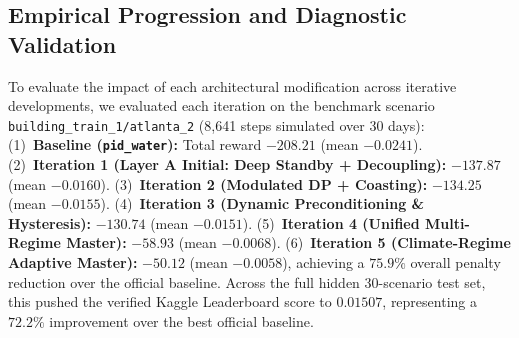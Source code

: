 \documentclass{article}
\begin{document}
\begin{table}[h]
\centering
\caption{Official Kaggle Competition Leaderboard Performance on 30 Hidden Test Scenarios (MAE, lower is better).}
\label{tab:leaderboard}
\end{table}

\subsection{Empirical Progression and Diagnostic Validation}
To evaluate the impact of each architectural modification across iterative developments, we evaluated each iteration on the benchmark scenario \texttt{building\_train\_1/atlanta\_2} (8,641 steps simulated over 30 days):
(1)~\textbf{Baseline (\texttt{pid\_water}):} Total reward $-208.21$ (mean $-0.0241$).
(2)~\textbf{Iteration 1 (Layer A Initial: Deep Standby + Decoupling):} $-137.87$ (mean $-0.0160$).
(3)~\textbf{Iteration 2 (Modulated DP + Coasting):} $-134.25$ (mean $-0.0155$).
(4)~\textbf{Iteration 3 (Dynamic Preconditioning \& Hysteresis):} $-130.74$ (mean $-0.0151$).
(5)~\textbf{Iteration 4 (Unified Multi-Regime Master):} $-58.93$ (mean $-0.0068$).
(6)~\textbf{Iteration 5 (Climate-Regime Adaptive Master):} $\mathbf{-50.12}$ (mean $\mathbf{-0.0058}$), achieving a $\mathbf{75.9\%}$ overall penalty reduction over the official baseline. Across the full hidden 30-scenario test set, this pushed the verified Kaggle Leaderboard score to $\mathbf{0.01507}$, representing a $\mathbf{72.2\%}$ improvement over the best official baseline.
\end{document}
